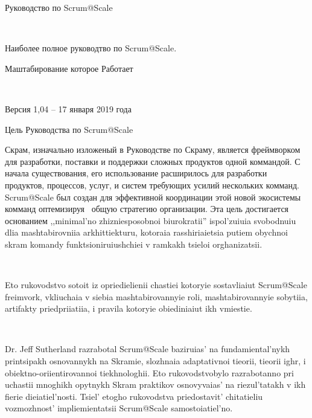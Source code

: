 \documentclass[10pt]{article}
\begin{document}
\title{}



\author[1]{Vasili Shymanski}%
%


\vspace{-1em}



  \date{\today}


\begingroup
\let\center\flushleft
\let\endcenter\endflushleft
\maketitle
\endgroup









Руководство по Scrum@Scale {}

~

Наиболее полное руководтво по Scrum@Scale.

Маштабирование которое Работает

~

Версия 1,04 -- 17 января 2019 года

\par\null\par\null

Цель Руководства по Scrum@Scale{}

Скрам, изначально изложеный в Руководстве по Скраму, является
фреймворком для разработки, поставки и поддержки сложных продуктов одной
коммандой. С начала существования, его использование расширилось для
разработки продуктов, процессов, услуг, и систем требующих усилий
нескольких комманд. Scrum@Scale был создан для эффективной координации
этой новой экосистемы комманд оптемизируя ~общую стратегию организации.
Эта цель достигается основанием ,,minimal'no zhizniesposobnoi biurokratii''
ispol'zuiuia svobodnuiu dlia mashtabirovniia arkhittiekturu, kotoraia rasshiriaietsia
putiem obychnoi skram komandy funktsioniruiushchiei v ramkakh tsieloi orghanizatsii.

~

Eto rukovodstvo sotoit iz opriedielienii chastiei kotoryie sostavliaiut
Scrum@Scale freimvork, vkliuchaia v siebia mashtabirovannyie roli,
mashtabirovannyie sobytiia, artifakty priedpriiatiia, i pravila kotoryie
obiediniaiut ikh vmiestie.

~

Dr. Jeff Sutherland razrabotal Scrum@Scale baziruias' na fundamiental'nykh
printsipakh osnovannykh na Skramie, slozhnaia adaptativnoi tieorii, tieorii ighr,
i obiektno-oriientirovannoi tiekhnologhii. Eto rukovodstvobylo razrabotanno
pri uchastii mnoghikh opytnykh Skram praktikov osnovyvaias' na riezul'tatakh v
ikh fierie dieiatiel'nosti. Tsiel' etogho rukovodstva priedostavit' chitatieliu
vozmozhnost' impliemientatsii Scrum@Scale samostoiatiel'no.
\end{document}
